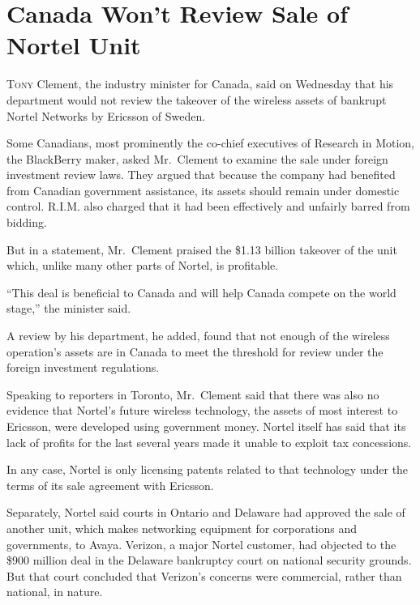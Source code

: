 ﻿\documentclass[12pt]{article}
\begin{document}
\section{Canada Won't Review Sale of Nortel Unit}

\lettrine{T}{ony} Clement, the industry minister for Canada, said on Wednesday that his department
would not review the takeover of the wireless assets of bankrupt Nortel Networks by Ericsson of
Sweden.

Some Canadians, most prominently the co-chief executives of Research in Motion, the BlackBerry
maker, asked Mr.~Clement to examine the sale under foreign investment review laws. They argued that
because the company had benefited from Canadian government assistance, its assets should remain
under domestic control. R.I.M. also charged that it had been effectively and unfairly barred from
bidding.

But in a statement, Mr.~Clement praised the \$1.13 billion takeover of the unit which, unlike many
other parts of Nortel, is profitable.

``This deal is beneficial to Canada and will help Canada compete on the world stage,'' the minister
said.

A review by his department, he added, found that not enough of the wireless operation's assets are
in Canada to meet the threshold for review under the foreign investment regulations.

Speaking to reporters in Toronto, Mr.~Clement said that there was also no evidence that Nortel's
future wireless technology, the assets of most interest to Ericsson, were developed using government
money. Nortel itself has said that its lack of profits for the last several years made it unable to
exploit tax concessions.

In any case, Nortel is only licensing patents related to that technology under the terms of its sale
agreement with Ericsson.

Separately, Nortel said courts in Ontario and Delaware had approved the sale of another unit, which
makes networking equipment for corporations and governments, to Avaya. Verizon, a major Nortel
customer, had objected to the \$900 million deal in the Delaware bankruptcy court on national
security grounds. But that court concluded that Verizon's concerns were commercial, rather than
national, in nature.

\vocabulary
\end{document}
